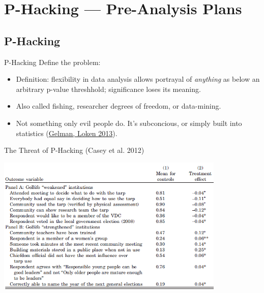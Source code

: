 \documentclass{beamer}
\begin{document}
\section{P-Hacking --- Pre-Analysis Plans}
\subsection*{P-Hacking}
\begin{frame}[<.->]{P-Hacking}
Define the problem:
\begin{itemize}
\item
Definition: flexibility in data analysis allows portrayal of \textit{anything} as below an arbitrary p-value threshhold; significance loses its meaning.
\item
Also called fishing, researcher degrees of freedom, or data-mining.
\item
Not something only evil people do. It's subconcious, or simply built into statistics (\href{http://www.stat.columbia.edu/~gelman/research/unpublished/p_hacking.pdf}{Gelman, Loken 2013}).
\end{itemize}
\end{frame}

\begin{frame}{The Threat of P-Hacking (Casey et al. 2012)}

\hspace*{-1em}
\includegraphics[height=2.6in]{../Images/GoBifo1.PNG}

\end{frame}
\end{document}
